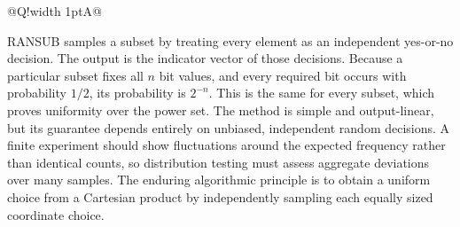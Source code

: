 \documentclass[10pt,letterpaper]{article}
\begin{document}
\begin{longtable}{@{}Q!{\color{Mist}\vrule width 1pt}A@{}}
\end{longtable}
\begin{tcolorbox}[colback=Ink!4,colframe=Ink,title=Cornell summary]
RANSUB samples a subset by treating every element as an independent yes-or-no decision. The output is the indicator vector of those decisions. Because a particular subset fixes all $n$ bit values, and every required bit occurs with probability $1/2$, its probability is $2^{-n}$. This is the same for every subset, which proves uniformity over the power set. The method is simple and output-linear, but its guarantee depends entirely on unbiased, independent random decisions. A finite experiment should show fluctuations around the expected frequency rather than identical counts, so distribution testing must assess aggregate deviations over many samples. The enduring algorithmic principle is to obtain a uniform choice from a Cartesian product by independently sampling each equally sized coordinate choice.
\end{tcolorbox}
\end{document}
